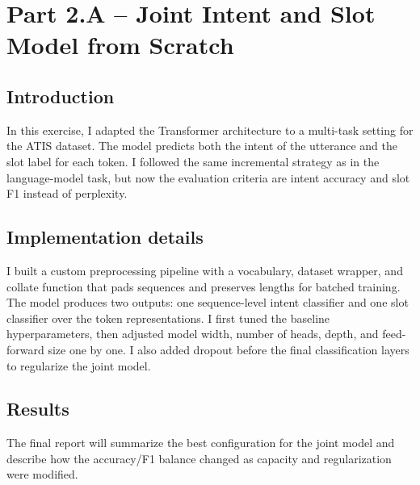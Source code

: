 \section{Part 2.A -- Joint Intent and Slot Model from Scratch}

\subsection{Introduction}
In this exercise, I adapted the Transformer architecture to a multi-task setting for the ATIS dataset. The model predicts both the intent of the utterance and the slot label for each token. I followed the same incremental strategy as in the language-model task, but now the evaluation criteria are intent accuracy and slot F1 instead of perplexity.

\subsection{Implementation details}
I built a custom preprocessing pipeline with a vocabulary, dataset wrapper, and collate function that pads sequences and preserves lengths for batched training. The model produces two outputs: one sequence-level intent classifier and one slot classifier over the token representations. I first tuned the baseline hyperparameters, then adjusted model width, number of heads, depth, and feed-forward size one by one. I also added dropout before the final classification layers to regularize the joint model.

\subsection{Results}
The final report will summarize the best configuration for the joint model and describe how the accuracy/F1 balance changed as capacity and regularization were modified.
